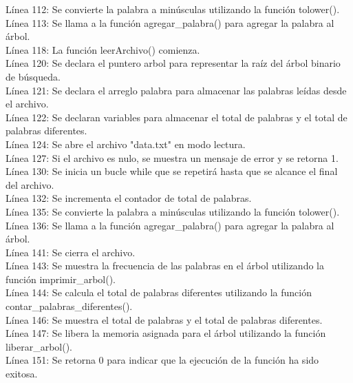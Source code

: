 \documentclass[]{article}
\begin{document}
Línea 112: Se convierte la palabra a minúsculas utilizando la función tolower().\\
Línea 113: Se llama a la función agregar\_palabra() para agregar la palabra al árbol.\\
Línea 118: La función leerArchivo() comienza.\\
Línea 120: Se declara el puntero arbol para representar la raíz del árbol binario de búsqueda.\\
Línea 121: Se declara el arreglo palabra para almacenar las palabras leídas desde el archivo.\\
Línea 122: Se declaran variables para almacenar el total de palabras y el total de palabras diferentes.\\
Línea 124: Se abre el archivo "data.txt" en modo lectura.\\
Línea 127: Si el archivo es nulo, se muestra un mensaje de error y se retorna 1.\\
Línea 130: Se inicia un bucle while que se repetirá hasta que se alcance el final del archivo.\\
Línea 132: Se incrementa el contador de total de palabras.\\
Línea 135: Se convierte la palabra a minúsculas utilizando la función tolower().\\
Línea 136: Se llama a la función agregar\_palabra() para agregar la palabra al árbol.\\
Línea 141: Se cierra el archivo.\\
Línea 143: Se muestra la frecuencia de las palabras en el árbol utilizando la función imprimir\_arbol().\\
Línea 144: Se calcula el total de palabras diferentes utilizando la función contar\_palabras\_diferentes().\\
Línea 146: Se muestra el total de palabras y el total de palabras diferentes.\\
Línea 147: Se libera la memoria asignada para el árbol utilizando la función liberar\_arbol().\\
Línea 151: Se retorna 0 para indicar que la ejecución de la función ha sido exitosa.\\
\end{document}
